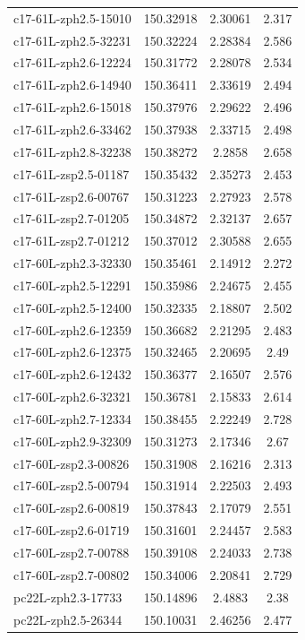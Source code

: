 \documentclass[twocolumn,tight,times]{aastex63}
\begin{document}
\begin{center}
\begin{longtable}{l|c|c|c}
c17-61L-zph2.5-15010 & 150.32918 & 2.30061 & 2.317 \\
c17-61L-zph2.5-32231 & 150.32224 & 2.28384 & 2.586 \\
c17-61L-zph2.6-12224 & 150.31772 & 2.28078 & 2.534 \\
c17-61L-zph2.6-14940 & 150.36411 & 2.33619 & 2.494 \\
c17-61L-zph2.6-15018 & 150.37976 & 2.29622 & 2.496 \\
c17-61L-zph2.6-33462 & 150.37938 & 2.33715 & 2.498 \\
c17-61L-zph2.8-32238 & 150.38272 & 2.2858 & 2.658 \\
c17-61L-zsp2.5-01187 & 150.35432 & 2.35273 & 2.453 \\
c17-61L-zsp2.6-00767 & 150.31223 & 2.27923 & 2.578 \\
c17-61L-zsp2.7-01205 & 150.34872 & 2.32137 & 2.657 \\
c17-61L-zsp2.7-01212 & 150.37012 & 2.30588 & 2.655 \\
c17-60L-zph2.3-32330 & 150.35461 & 2.14912 & 2.272 \\
c17-60L-zph2.5-12291 & 150.35986 & 2.24675 & 2.455 \\
c17-60L-zph2.5-12400 & 150.32335 & 2.18807 & 2.502 \\
c17-60L-zph2.6-12359 & 150.36682 & 2.21295 & 2.483 \\
c17-60L-zph2.6-12375 & 150.32465 & 2.20695 & 2.49 \\
c17-60L-zph2.6-12432 & 150.36377 & 2.16507 & 2.576 \\
c17-60L-zph2.6-32321 & 150.36781 & 2.15833 & 2.614 \\
c17-60L-zph2.7-12334 & 150.38455 & 2.22249 & 2.728 \\
c17-60L-zph2.9-32309 & 150.31273 & 2.17346 & 2.67 \\
c17-60L-zsp2.3-00826 & 150.31908 & 2.16216 & 2.313 \\
c17-60L-zsp2.5-00794 & 150.31914 & 2.22503 & 2.493 \\
c17-60L-zsp2.6-00819 & 150.37843 & 2.17079 & 2.551 \\
c17-60L-zsp2.6-01719 & 150.31601 & 2.24457 & 2.583 \\
c17-60L-zsp2.7-00788 & 150.39108 & 2.24033 & 2.738 \\
c17-60L-zsp2.7-00802 & 150.34006 & 2.20841 & 2.729 \\
pc22L-zph2.3-17733 & 150.14896 & 2.4883 & 2.38 \\
pc22L-zph2.5-26344 & 150.10031 & 2.46256 & 2.477 \\

\end{longtable}
\end{center}
\end{document}
